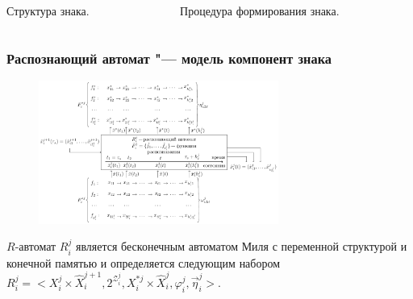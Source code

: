 \documentclass[default]{beamer}
\begin{document}
\begin{frame}
\begin{columns}
\begin{column}{0.5\textwidth}
\begin{figure}
				\end{figure}
			\end{column}
		\end{columns}
		\begin{columns}
			\begin{column}{0.5\textwidth}
				\begin{center}
					Структура знака.
				\end{center}
			\end{column}
			\begin{column}{0.5\textwidth}
				\begin{center}
					Процедура формирования знака.
				\end{center}
			\end{column}
		\end{columns}
	\end{frame}
	
	\begin{frame}
		\frametitle{Распознающий автомат "--- модель компонент знака}
			\begin{figure}
				\includegraphics[width=0.7\textwidth]{../rb_io}
			\end{figure}

			$R$-автомат $R_i^j$ является бесконечным автоматом Миля с переменной структурой и конечной памятью и определяется следующим набором $R_i^j=<X_i^j\times \hat{X}_i^{j+1}, 2^{\mathcal Z_i^j}, X_i^{*j}\times \hat{X}_i^j,\varphi_i^j,\vec\eta_i^j>$.	
	\end{frame}
\end{document}
